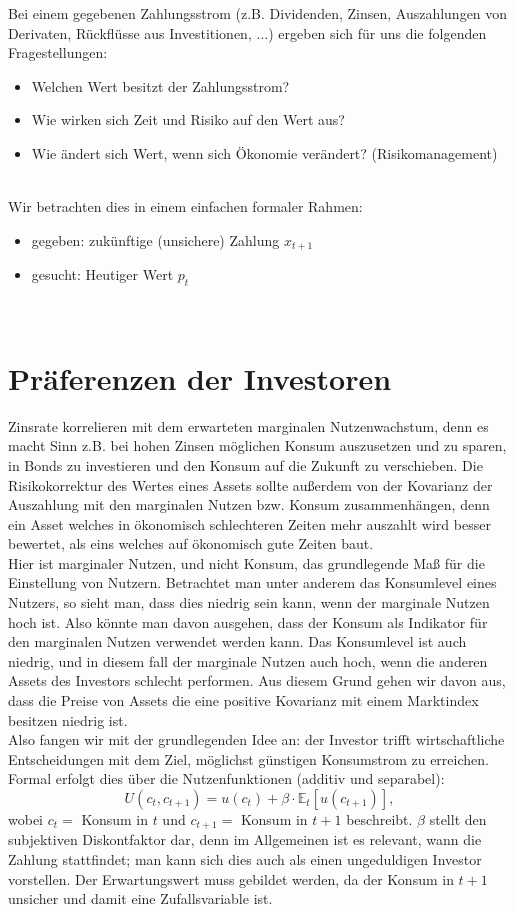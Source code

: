 \documentclass[12pt]{extreport} %
\theoremstyle{named}
\theoremstyle{nnamed}
\theoremstyle{itshape}
\theoremstyle{normal}
\begin{document}
Bei einem gegebenen Zahlungsstrom (z.B. Dividenden, Zinsen, Auszahlungen von Derivaten, Rückflüsse aus Investitionen, $\dotsc$) ergeben sich für uns die folgenden Fragestellungen: 
\begin{itemize}
	\item Welchen Wert besitzt der Zahlungsstrom?
	\item Wie wirken sich Zeit und Risiko auf den Wert aus?
	\item Wie ändert sich Wert, wenn sich Ökonomie verändert? (Risikomanagement)
\end{itemize}
~\\
Wir betrachten dies in einem einfachen formaler Rahmen:
\begin{itemize}
	\item gegeben: zukünftige (unsichere) Zahlung $x_{t+1}$
	\item gesucht: Heutiger Wert $p_t$
\end{itemize} ~\newpage

\section{Präferenzen der Investoren}

Zinsrate korrelieren mit dem erwarteten marginalen Nutzenwachstum, denn es macht Sinn z.B. bei hohen Zinsen möglichen Konsum auszusetzen und zu sparen, in Bonds zu investieren und den Konsum auf die Zukunft zu verschieben. Die Risikokorrektur des Wertes eines Assets sollte außerdem von der Kovarianz der Auszahlung mit den marginalen Nutzen bzw. Konsum zusammenhängen, denn ein Asset welches in ökonomisch schlechteren Zeiten mehr auszahlt wird besser bewertet, als eins welches auf ökonomisch gute Zeiten baut. ~\\

Hier ist marginaler Nutzen, und nicht Konsum, das grundlegende Maß für die Einstellung von Nutzern. Betrachtet man unter anderem das Konsumlevel eines Nutzers, so sieht man, dass dies niedrig sein kann, wenn der marginale Nutzen hoch ist. Also könnte man davon ausgehen, dass der Konsum als Indikator für den marginalen Nutzen verwendet werden kann. Das Konsumlevel ist auch niedrig, und in diesem fall der marginale Nutzen auch hoch, wenn die anderen Assets des Investors schlecht performen. Aus diesem Grund gehen wir davon aus, dass die Preise von Assets die eine positive Kovarianz mit einem Marktindex besitzen niedrig ist. ~\\


Also fangen wir mit der grundlegenden Idee an: der Investor trifft wirtschaftliche Entscheidungen mit dem Ziel, möglichst günstigen Konsumstrom zu erreichen. Formal erfolgt dies über die Nutzenfunktionen (additiv und separabel):
	$$ U(c_t, c_{t+1}) = u(c_t) + \beta \cdot \mathbb{E}_t\left[ u\left(c_{t+1}\right) \right], $$
wobei $c_t =$ Konsum in $t$ und $c_{t+1} =$ Konsum in $t+1$ beschreibt. $\beta$ stellt den subjektiven Diskontfaktor dar, denn im Allgemeinen ist es relevant, wann die Zahlung stattfindet; man kann sich dies auch als einen ungeduldigen Investor vorstellen. Der Erwartungswert muss gebildet werden, da der Konsum in $t+1$ unsicher und damit eine Zufallsvariable ist. 
\end{document}
